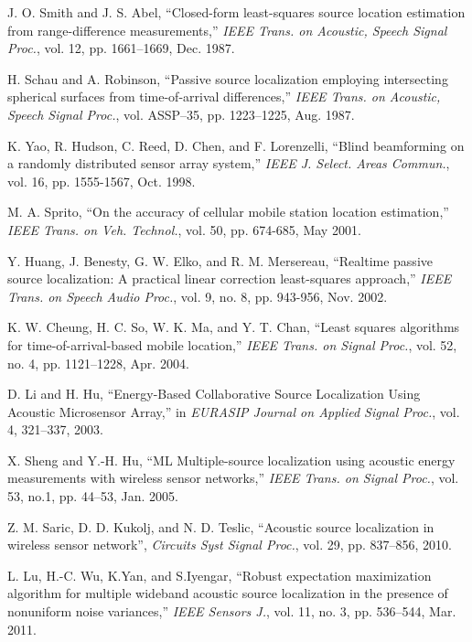 \begin{thebibliography}{99}


 \label{r1}
J. O. Smith and J. S. Abel, ``Closed-form least-squares source location estimation from range-difference measurements,'' {\em IEEE Trans. on Acoustic, Speech Signal Proc.}, vol. 12, pp. 1661--1669, Dec. 1987.

 \label{r4}
H. Schau and A. Robinson, ``Passive source localization employing intersecting spherical surfaces from time-of-arrival differences,'' {\em IEEE Trans. on Acoustic, Speech Signal Proc.}, vol. ASSP--35, pp. 1223--1225, Aug. 1987.

 \label{r6}
K. Yao, R. Hudson, C. Reed, D. Chen, and F. Lorenzelli, ``Blind beamforming on a randomly distributed sensor array system,'' {\em IEEE J. Select. Areas Commun.}, vol. 16, pp. 1555-1567, Oct. 1998.

M. A. Sprito, ``On the accuracy of cellular mobile station location estimation,'' {\em IEEE Trans. on Veh. Technol.}, vol. 50, pp. 674-685, May 2001.

 \label{3}
Y. Huang, J. Benesty, G. W. Elko, and R. M. Mersereau, ``Realtime passive source localization: A practical linear correction least-squares approach,'' {\em IEEE Trans. on Speech Audio Proc.}, vol. 9, no. 8, pp. 943-956, Nov. 2002.


 \label{r9}
K. W. Cheung, H. C. So, W. K. Ma, and Y. T. Chan, ``Least squares algorithms for time-of-arrival-based mobile location,'' {\em IEEE Trans. on Signal Proc.}, vol. 52, no. 4, pp. 1121--1228, Apr. 2004.

 \label{r5}
D. Li and H. Hu, ``Energy-Based Collaborative Source Localization Using Acoustic Microsensor Array,'' in {\em EURASIP Journal on Applied Signal Proc.}, vol. 4, 321--337, 2003.

X. Sheng and Y.-H. Hu, ``ML Multiple-source localization using acoustic energy measurements with wireless sensor networks,'' {\em IEEE Trans. on Signal Proc.}, vol. 53, no.1, pp. 44--53, Jan. 2005.

Z. M. Saric, D. D. Kukolj, and N. D. Teslic, ``Acoustic source localization in wireless sensor network'', {\em Circuits Syst Signal Proc.}, vol. 29, pp. 837--856, 2010.

L. Lu, H.-C. Wu, K.Yan, and S.Iyengar, ``Robust expectation maximization algorithm for multiple wideband acoustic source localization  in  the  presence  of  nonuniform  noise  variances,'' {\em IEEE Sensors J.}, vol. 11, no. 3, pp. 536--544, Mar. 2011.


\end{thebibliography}
